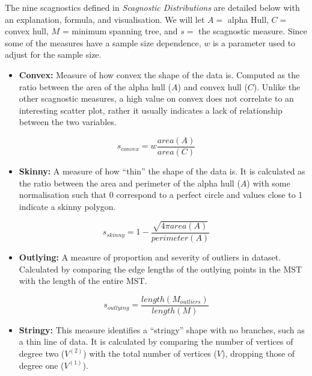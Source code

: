 The nine scagnostics defined in \emph{Scagnostic Distributions} are
detailed below with an explanation, formula, and visualisation. We will
let \(A=\) alpha Hull, \(C=\) convex hull, \(M\) = minimum spanning
tree, and \(s=\) the scagnostic measure. Since some of the measures have
a sample size dependence, \(w\) is a parameter used to adjust for the
sample size.

\begin{itemize}
\tightlist
\item
  \textbf{Convex:} Measure of how convex the shape of the data is.
  Computed as the ratio between the area of the alpha hull (\(A\)) and
  convex hull (\(C\)). Unlike the other scagnostic measures, a high
  value on convex does not correlate to an interesting scatter plot,
  rather it usually indicates a lack of relationship between the two
  variables.
\end{itemize}

\[s_{convex}=w\frac{area(A)}{area(C)}\]

\begin{itemize}
\tightlist
\item
  \textbf{Skinny:} A measure of how ``thin'' the shape of the data is.
  It is calculated as the ratio between the area and perimeter of the
  alpha hull (\(A\)) with some normalisation such that 0 correspond to a
  perfect circle and values close to 1 indicate a skinny polygon.
\end{itemize}

\[s_{skinny}= 1-\frac{\sqrt{4\pi area(A)}}{perimeter(A)}\]

\begin{itemize}
\tightlist
\item
  \textbf{Outlying:} A measure of proportion and severity of outliers in
  dataset. Calculated by comparing the edge lengths of the outlying
  points in the MST with the length of the entire MST.
\end{itemize}

\[s_{outlying}=\frac{length(M_{outliers})}{length(M)}\]

\begin{itemize}
\tightlist
\item
  \textbf{Stringy:} This measure identifies a ``stringy'' shape with no
  branches, such as a thin line of data. It is calculated by comparing
  the number of vertices of degree two (\(V^{(2)}\)) with the total
  number of vertices (\(V\)), dropping those of degree one
  (\(V^{(1)}\)).
\end{itemize}

